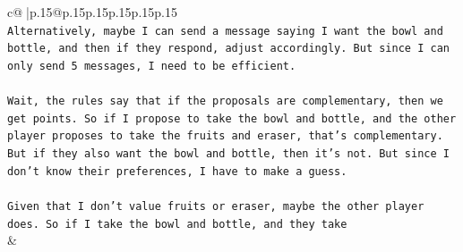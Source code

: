 \documentclass{article}
\begin{document}
{\begin{supertabular}{c@{$\;$}|p{.15\linewidth}@{}p{.15\linewidth}p{.15\linewidth}p{.15\linewidth}p{.15\linewidth}p{.15\linewidth}}
{{{\\ 
\texttt{Alternatively, maybe I can send a message saying I want the bowl and bottle, and then if they respond, adjust accordingly. But since I can only send 5 messages, I need to be efficient.} \\
\\ 
\texttt{Wait, the rules say that if the proposals are complementary, then we get points. So if I propose to take the bowl and bottle, and the other player proposes to take the fruits and eraser, that's complementary. But if they also want the bowl and bottle, then it's not. But since I don't know their preferences, I have to make a guess.} \\
\\ 
\texttt{Given that I don't value fruits or eraser, maybe the other player does. So if I take the bowl and bottle, and they take} \\
            }
        }
    }
    & \\ \\


\end{supertabular}}
\end{document}
